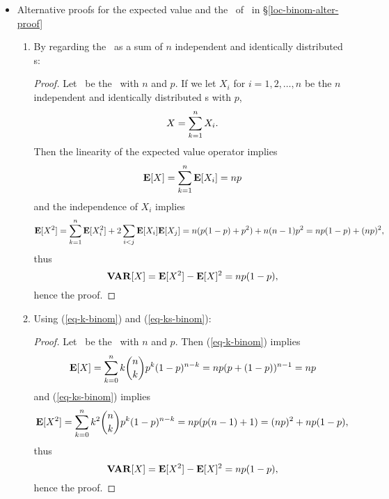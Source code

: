 \begin{itemize}
	\item Alternative proofs for the expected value and the \var\ of \binomrv\ in \S\ref{loc-binom-alter-proof}
	\begin{enumerate}
		\item By regarding the \binomrv\ as a sum of $n$ independent and identically distributed
		\bernrv s:
		\begin{proof}
		Let \X\ be the \binomrv\ with $n$ and $p$.
		If we let $X_i$ for $i=1,2,\ldots,n$
		be the $n$ independent and identically distributed \bernrv s with $p$,
		\[
			X = \sum_{k=1}^{n} X_i.
		\]
		Then the linearity of the expected value operator
		implies
		\[
			{\bf E}[X] = \sum_{k=1}^{n} {\bf E}[X_i] = np
		\]
		and the independence of $X_i$ implies
		\[
			{\bf E}[X^2] = \sum_{k=1}^{n} {\bf E}[X_i^2] + 2\sum_{i<j} {\bf E}[X_i]{\bf E}[X_j]
			= n(p(1-p)+p^2) + n(n-1)p^2
			= np(1-p) + (np)^2,
		\]
		thus
		\[
			{\bf VAR}[X] = {\bf E}[X^2] - {\bf E}[X]^2
			= np(1-p),
		\]
		hence the proof.
		\end{proof}
		
		\item Using (\ref{eq-k-binom}) and (\ref{eq-ks-binom}):
		\begin{proof}
		Let \X\ be the \binomrv\ with $n$ and $p$.
		Then (\ref{eq-k-binom}) implies
		\[
			{\bf E}[X] = \sum_{k=0}^{n} k {{{n}} \choose {{k}}}{p}^{k}(1-{p})^{{n}-{k}}
			= np (p+(1-p))^{n-1} = np
		\]
		and (\ref{eq-ks-binom}) implies
		\[
			{\bf E}[X^2] = \sum_{k=0}^{n} k^2 {{{n}} \choose {{k}}}{p}^{k}(1-{p})^{{n}-{k}}
			 = np(p(n-1)+1)
			 = (np)^2 + np(1-p),
		\]
		thus
		\[
			{\bf VAR}[X] = {\bf E}[X^2] - {\bf E}[X]^2
			= np(1-p),
		\]
		hence the proof.
		\end{proof}
	\end{enumerate}
\end{itemize}
